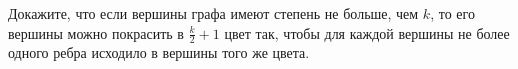 Докажите, что если вершины графа имеют степень не больше, чем $k$, то его вершины можно покрасить в $\frac{k}{2} + 1$ цвет
так, чтобы для каждой вершины не более одного ребра исходило в вершины того же цвета.